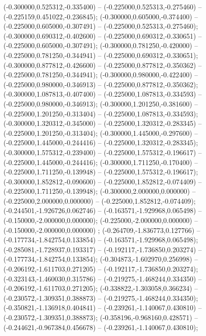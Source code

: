  (-0.300000,0.525312,-0.335400) -- (-0.225000,0.525313,-0.275460) -- (-0.225159,0.451022,-0.236845);
 (-0.300000,0.605000,-0.374400) -- (-0.225000,0.605000,-0.307491) -- (-0.225000,0.525313,-0.275460);
 (-0.300000,0.690312,-0.402600) -- (-0.225000,0.690312,-0.330651) -- (-0.225000,0.605000,-0.307491);
 (-0.300000,0.781250,-0.420000) -- (-0.225000,0.781250,-0.344941) -- (-0.225000,0.690312,-0.330651);
 (-0.300000,0.877812,-0.426600) -- (-0.225000,0.877812,-0.350362) -- (-0.225000,0.781250,-0.344941);
 (-0.300000,0.980000,-0.422400) -- (-0.225000,0.980000,-0.346913) -- (-0.225000,0.877812,-0.350362);
 (-0.300000,1.087813,-0.407400) -- (-0.225000,1.087813,-0.334593) -- (-0.225000,0.980000,-0.346913);
 (-0.300000,1.201250,-0.381600) -- (-0.225000,1.201250,-0.313404) -- (-0.225000,1.087813,-0.334593);
 (-0.300000,1.320312,-0.345000) -- (-0.225000,1.320312,-0.283345) -- (-0.225000,1.201250,-0.313404);
 (-0.300000,1.445000,-0.297600) -- (-0.225000,1.445000,-0.244416) -- (-0.225000,1.320312,-0.283345);
 (-0.300000,1.575312,-0.239400) -- (-0.225000,1.575312,-0.196617) -- (-0.225000,1.445000,-0.244416);
 (-0.300000,1.711250,-0.170400) -- (-0.225000,1.711250,-0.139948) -- (-0.225000,1.575312,-0.196617);
 (-0.300000,1.852812,-0.090600) -- (-0.225000,1.852812,-0.074409) -- (-0.225000,1.711250,-0.139948);
 (-0.300000,2.000000,0.000000) -- (-0.225000,2.000000,0.000000) -- (-0.225000,1.852812,-0.074409);
 (-0.244501,-1.926726,0.062746) -- (-0.163571,-1.929968,0.065498) -- (-0.150000,-2.000000,0.000000);
 (-0.225000,-2.000000,0.000000) -- (-0.150000,-2.000000,0.000000) ;
 (-0.264709,-1.836773,0.127766) -- (-0.177734,-1.842754,0.133854) -- (-0.163571,-1.929968,0.065498);
 (-0.285081,-1.728937,0.193317) -- (-0.192117,-1.736850,0.203274) -- (-0.177734,-1.842754,0.133854);
 (-0.304873,-1.602970,0.256998) -- (-0.206192,-1.611703,0.271205) -- (-0.192117,-1.736850,0.203274);
 (-0.323143,-1.460030,0.315786) -- (-0.219275,-1.468244,0.334350) -- (-0.206192,-1.611703,0.271205);
 (-0.338822,-1.303058,0.366234) -- (-0.230572,-1.309351,0.388873) -- (-0.219275,-1.468244,0.334350);
 (-0.350821,-1.136918,0.404841) -- (-0.239261,-1.140067,0.430810) -- (-0.230572,-1.309351,0.388873);
 (-0.358196,-0.968160,0.428571) -- (-0.244621,-0.967384,0.456678) -- (-0.239261,-1.140067,0.430810);
